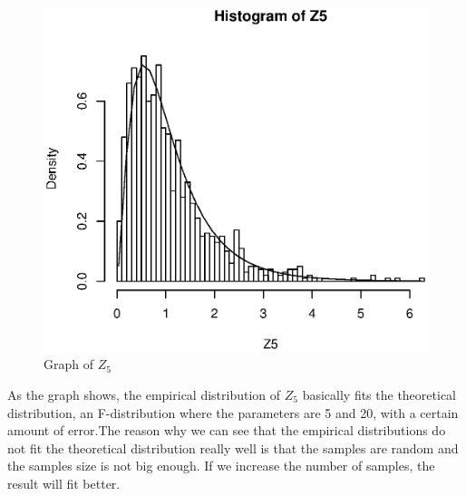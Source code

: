 \documentclass[a4paper,11pt,fleqn]{article}
\begin{document}
\begin{figure}[h!]
\centering
\includegraphics[scale=0.8]{Z5.eps}
\caption{Graph of $Z_5$}
\label{fig: $Z_5$}
\end{figure}

As the graph shows, the empirical distribution of $Z_5$ basically fits the theoretical distribution, an F-distribution where the parameters are 5 and 20, with a certain amount of error.The reason why we can see that the empirical distributions do not fit the theoretical distribution really well is that the samples are random and the samples size is not big enough. If we increase the number of samples, the result will fit better.
\end{document}
